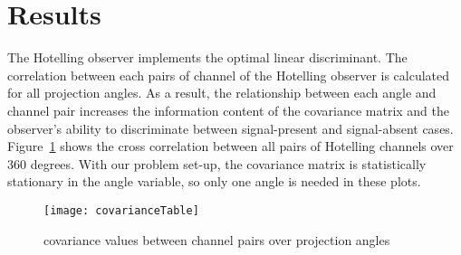\section{Results}
The Hotelling observer implements the optimal linear discriminant. The correlation between each pairs of channel of the Hotelling observer is calculated for all projection angles.  As a result, the relationship between each angle and channel pair increases the information content of the covariance matrix and the observer's ability to discriminate between signal-present and signal-absent cases. Figure~\ref{fig: covarianceTable} shows the cross correlation between all pairs of Hotelling channels over 360 degrees.  With our problem set-up, the covariance matrix is statistically stationary in the angle variable, so only one angle is needed in these plots.

\begin{figure}[ht]
\texttt{[image: covarianceTable]}
\caption{covariance values between channel pairs over projection angles}
\label{fig: covarianceTable}
\end{figure}

